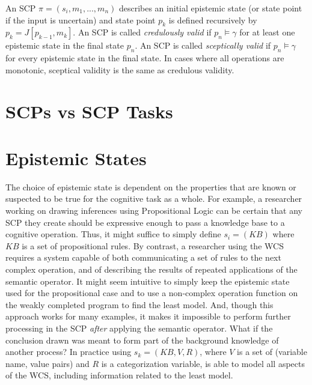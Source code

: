 \documentclass[
11pt, %
english, %
singlespacing, %
headsepline, %
]{MastersDoctoralThesis} %
\begin{document}
An SCP $\pi=(s_i,m_1,...,m_n)$ describes an initial epistemic state (or state point if the input is uncertain) and state point $p_k$ is defined recursively by $p_k = J[p_{k-1},m_k]$. An SCP is called \textit{credulously valid} if $p_n \models \gamma$ for at least one epistemic state in the final state $p_n$. An SCP is called \textit{sceptically valid} if $p_n \models \gamma$ for every epistemic state in the final state. In cases where all operations are monotonic, sceptical validity is the same as credulous validity.
\section{SCPs vs SCP Tasks}
\section{Epistemic States}
The choice of epistemic state is dependent on the properties that are known or suspected to be true for the cognitive task as a whole. For example, a researcher working on drawing inferences using Propositional Logic can be certain that any SCP they create should be expressive enough to pass a knowledge base to a cognitive operation. Thus, it might suffice to simply define $s_i=(KB)$ where $KB$ is a set of propositional rules. By contrast, a researcher using the WCS requires a system capable of both communicating a set of rules to the next complex operation, and of describing the results of repeated applications of the semantic operator. It might seem intuitive to simply keep the epistemic state used for the propositional case and to use a non-complex operation function on the weakly completed program to find the least model. And, though this approach works for many examples, it makes it impossible to perform further processing in the SCP \textit{after} applying the semantic operator. What if the conclusion drawn was meant to form part of the background knowledge of another process? In practice using $s_k=(KB,V, R)$, where $V$ is a set of (variable name, value pairs) and $R$ is a categorization variable, is able to model all aspects of the WCS, including information related to the least model. 
\end{document}
